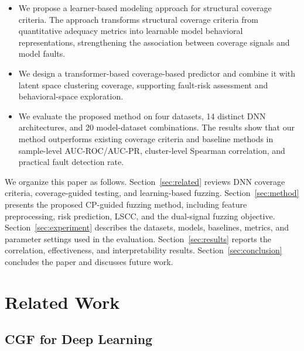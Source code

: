 \documentclass[preprint,number,5p,twocolumn]{elsarticle}
\begin{document}
\begin{itemize}

    \item We propose a learner-based modeling approach for structural coverage criteria. The approach transforms structural coverage criteria from quantitative adequacy metrics into learnable model behavioral representations, strengthening the association between coverage signals and model faults.

    \item We design a transformer-based coverage-based predictor and combine it with latent space clustering coverage, supporting fault-risk assessment and behavioral-space exploration.

    \item We evaluate the proposed method on four datasets, 14 distinct DNN architectures, and 20 model-dataset combinations. The results show that our method outperforms existing coverage criteria and baseline methods in sample-level AUC-ROC/AUC-PR, cluster-level Spearman correlation, and practical fault detection rate.

\end{itemize}

\par We organize this paper as follows. Section~\ref{sec:related} reviews DNN coverage criteria, coverage-guided testing, and learning-based fuzzing. Section~\ref{sec:method} presents the proposed CP-guided fuzzing method, including feature preprocessing, risk prediction, LSCC, and the dual-signal fuzzing objective. Section~\ref{sec:experiment} describes the datasets, models, baselines, metrics, and parameter settings used in the evaluation. Section~\ref{sec:results} reports the correlation, effectiveness, and interpretability results. Section~\ref{sec:conclusion} concludes the paper and discusses future work.

\section{Related Work}\label{related}\label{sec:related}

\subsection{CGF for Deep Learning}
\end{document}
